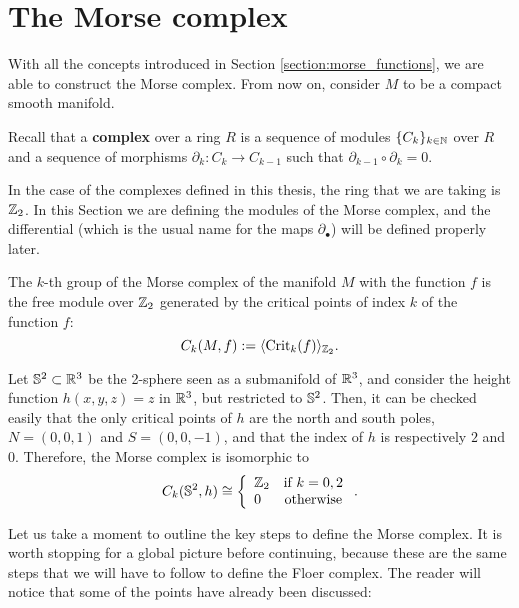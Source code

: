 \section{The Morse complex} \label{section:morse_complex}

With all the concepts introduced in Section \ref{section:morse_functions}, we are able to construct the Morse complex. From now on, consider $M$ to be a compact smooth manifold.

\begin{deff}
Recall that a {\bf complex} over a ring $R$ is a sequence of modules $\{ C_k \}_{k \in \mathbb{N}}$ over $R$ and a sequence of morphisms $\partial_k : C_k \rightarrow C_{k-1}$ such that $\partial_{k-1} \circ \partial_k = 0$.
\end{deff}

In the case of the complexes defined in this thesis, the ring that we are taking is $\mathbb{Z}_2$. In this Section we are defining the modules of the Morse complex, and the differential (which is the usual name for the maps $\partial_{\bullet}$) will be defined properly later.

\begin{deff}
The $k$-th group of the Morse complex of the manifold $M$ with the function $f$ is the free module over $\mathbb{Z}_2$ generated by the critical points of index $k$ of the function $f$:
\begin{displaymath}
C_k(M,f) := \langle \mathrm{Crit}_k(f) \rangle_{\mathbb{Z}_2} .
\end{displaymath}
\end{deff}

\begin{exmpl}
Let $\mathbb{S}^2 \subset \mathbb{R}^3$ be the 2-sphere seen as a submanifold of $\mathbb{R}^3$, and consider the height function $h(x,y,z) = z$ in $\mathbb{R}^3$, but restricted to $\mathbb{S}^2$. Then, it can be checked easily that the only critical points of $h$ are the north and south poles, $N = (0,0,1)$ and $S = (0,0,-1)$, and that the index of $h$ is respectively $2$ and $0$. Therefore, the Morse complex is isomorphic to
\[C_k(\mathbb{S}^2,h) \cong \left\{ \begin{array}{lc} \mathbb{Z}_2 & \text{if } k = 0, 2 \\ 0 & \text{otherwise} \end{array}\right. .\]
\end{exmpl}

Let us take a moment to outline the key steps to define the Morse complex. It is worth stopping for a global picture before continuing, because these are the same steps that we will have to follow to define the Floer complex. The reader will notice that some of the points have already been discussed:

